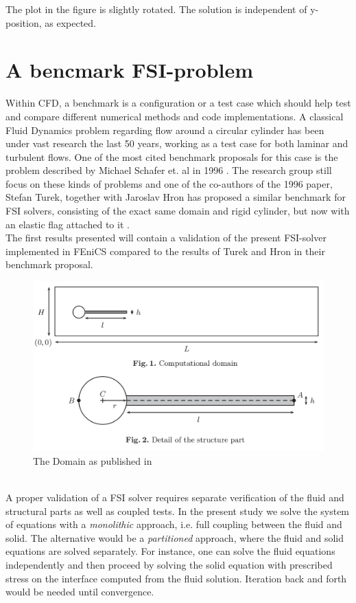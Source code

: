 The plot in the figure is slightly rotated. The solution is independent of y-position, as expected. 


\section{A bencmark FSI-problem}
Within CFD, a benchmark is a configuration or a test case which should help test and compare different numerical methods and code implementations. A classical Fluid Dynamics problem regarding flow around a circular cylinder has been under vast research the last 50 years, working as a test case for both laminar and turbulent flows. One of the most cited benchmark proposals for this case is the problem described by Michael Schafer et. al in 1996 \cite{Scha96}. The research group still focus on these kinds of problems and one of the co-authors of the 1996 paper, Stefan Turek, together with Jaroslav Hron has proposed a similar benchmark for FSI solvers, consisting of the exact same domain and rigid cylinder, but now with an elastic flag attached to it \cite{Ture06}. 
\\ The first results presented will contain a validation of the present FSI-solver implemented in FEniCS compared to the results of Turek and Hron in their benchmark proposal. 
\begin{figure}
\includegraphics[scale=0.3]{figures/Hron_Turek_geometry}
\caption{The Domain as published in \cite{Ture06}}
\label{fig:Geometry}
\end{figure}
\\
A proper validation of a FSI solver requires separate verification of the fluid and structural parts as well as coupled tests. In the present study we solve the system of equations with a \textit{monolithic} approach, i.e. full coupling between the fluid and solid. The alternative would be a \textit{partitioned} approach, where the fluid and solid equations are solved separately. For instance, one can solve the fluid equations independently and then proceed by solving the solid equation with prescribed stress on the interface computed from the fluid solution. Iteration back and forth would be needed until convergence. \\
